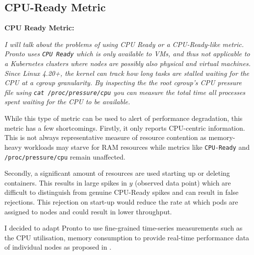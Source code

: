 \subsection{CPU-Ready Metric}
\begin{tcolorbox}[boxsep=0mm,left=2.5mm,right=2.5mm]
    \textbf{CPU Ready Metric:} {\em I will talk about the problems
    of using CPU Ready or a CPU-Ready-like metric. Pronto uses \verb|CPU Ready|
    which is only available to VMs, and thus not applicable to a Kubernetes
    clusters where nodes are possibly also physical and virtual machines. Since
    Linux 4.20+, the kernel can track how long tasks are stalled waiting for the
    CPU at a cgroup granularity. By inspecting the the root cgroup’s CPU
    pressure file using \verb|cat /proc/pressure/cpu| you can measure the total
    time all processes spent waiting for the CPU to be available.

    While this type of metric can be used to alert of performance degradation,
    this metric has a few shortcomings. Firstly, it only reports CPU-centric
    information. This is not always representative measure of resource
    contention as memory-heavy workloads may starve for RAM resources while
    metrics like \verb|CPU-Ready| and \verb|/proc/pressure/cpu| remain
    unaffected.

    Secondly, a significant amount of resources are used starting up or deleting
    containers. This results in large spikes in $y$ (observed data point) which
    are difficult to distinguish from genuine CPU-Ready spikes and can result in
    false rejections. This rejection on start-up would reduce the rate at which
    pods are assigned to nodes and could result in lower throughput.

    I decided to adapt Pronto to use fine-grained time-series measurements such
    as the CPU utilisation, memory consumption to provide real-time performance
    data of individual nodes as proposed in \cite{grammenos_pronto_2021}.
    }
\end{tcolorbox}


